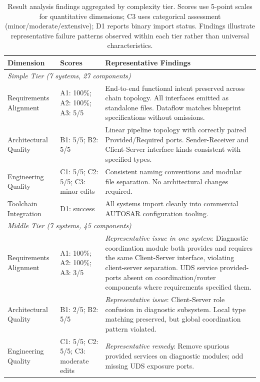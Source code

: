 \documentclass[acmlarge,nonacm]{acmart}
\theoremstyle{acmplain}
\theoremstyle{acmdefinition}
\begin{document}
\begin{table}[!htbp]
\centering
\small
\caption{Result analysis findings aggregated by complexity tier. Scores use 5-point scales for quantitative dimensions; C3 uses categorical assessment (minor/moderate/extensive); D1 reports binary import status. Findings illustrate representative failure patterns observed within each tier rather than universal characteristics.}
\label{tab:rq2-analysis}
\begin{tabular}{@{}lp{}p{}@{}}
\toprule
\textbf{Dimension} & \textbf{Scores} & \textbf{Representative Findings} \\
\midrule
\multicolumn{3}{l}{\textit{Simple Tier (7 systems, 27 components)}} \\
\midrule
Requirements Alignment & A1: 100\%; A2: 100\%; A3: 5/5 & End-to-end functional intent preserved across chain topology. All interfaces emitted as standalone files. Dataflow matches blueprint specifications without omissions. \\
Architectural Quality & B1: 5/5; B2: 5/5 & Linear pipeline topology with correctly paired Provided/Required ports. Sender-Receiver and Client-Server interface kinds consistent with specified types. \\
Engineering Quality & C1: 5/5; C2: 5/5; C3: minor edits & Consistent naming conventions and modular file separation. No architectural changes required. \\
Toolchain Integration & D1: success & All systems import cleanly into commercial AUTOSAR configuration tooling. \\
\midrule
\multicolumn{3}{l}{\textit{Middle Tier (7 systems, 45 components)}} \\
\midrule
Requirements Alignment & A1: 100\%; A2: 100\%; A3: 3/5 & \textit{Representative issue in one system}: Diagnostic coordination module both provides and requires the same Client-Server interface, violating client-server separation. UDS service provided-ports absent on coordination/router components where requirements specified them. \\
Architectural Quality & B1: 2/5; B2: 5/5 & \textit{Representative issue}: Client-Server role confusion in diagnostic subsystem. Local type matching preserved, but global coordination pattern violated. \\
Engineering Quality & C1: 5/5; C2: 5/5; C3: moderate edits & \textit{Representative remedy}: Remove spurious provided services on diagnostic modules; add missing UDS exposure ports. \\

\end{tabular}
\end{table}
\end{document}
